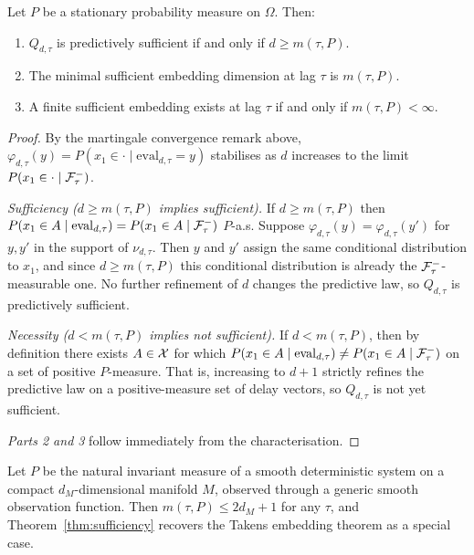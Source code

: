 \begin{theorem}\label{thm:sufficiency}
Let $P$ be a stationary probability measure on $\Omega$.  Then:
\begin{enumerate}
  \item $Q_{d,\tau}$ is predictively sufficient if and only if
    $d \geq m(\tau, P)$.
  \item The minimal sufficient embedding dimension at lag $\tau$ is
    $m(\tau, P)$.
  \item A finite sufficient embedding exists at lag $\tau$ if and only if
    $m(\tau, P) < \infty$.
\end{enumerate}
\end{theorem}

\begin{proof}
By the martingale convergence remark above, $\varphi_{d,\tau}(y) =
P(x_1 \in \cdot \mid \mathrm{eval}_{d,\tau} = y)$ stabilises as $d$
increases to the limit $P(x_1 \in \cdot \mid \mathcal{F}_\tau^-)$.

\textit{Sufficiency ($d \geq m(\tau,P)$ implies sufficient).}
If $d \geq m(\tau, P)$ then $P(x_1 \in A \mid \mathrm{eval}_{d,\tau})
= P(x_1 \in A \mid \mathcal{F}_\tau^-)$ $P$-a.s.  Suppose $\varphi_{d,\tau}(y)
= \varphi_{d,\tau}(y')$ for $y, y'$ in the support of $\nu_{d,\tau}$.
Then $y$ and $y'$ assign the same conditional distribution to $x_1$,
and since $d \geq m(\tau,P)$ this conditional distribution is already
the $\mathcal{F}_\tau^-$-measurable one.  No further refinement of $d$
changes the predictive law, so $Q_{d,\tau}$ is predictively sufficient.

\textit{Necessity ($d < m(\tau,P)$ implies not sufficient).}
If $d < m(\tau, P)$, then by definition there exists $A \in \mathcal{X}$ for
which $P(x_1 \in A \mid \mathrm{eval}_{d,\tau}) \neq P(x_1 \in A \mid
\mathcal{F}_\tau^-)$ on a set of positive $P$-measure.  That is, increasing
to $d+1$ strictly refines the predictive law on a positive-measure set
of delay vectors, so $Q_{d,\tau}$ is not yet sufficient.

\textit{Parts 2 and 3} follow immediately from the characterisation.
\end{proof}

\begin{corollary}\label{cor:takens}
Let $P$ be the natural invariant measure of a smooth deterministic system
on a compact $d_M$-dimensional manifold $M$, observed through a generic
smooth observation function.  Then $m(\tau, P) \leq 2d_M + 1$ for any
$\tau$, and Theorem~\ref{thm:sufficiency} recovers the Takens embedding
theorem as a special case.
\end{corollary}

